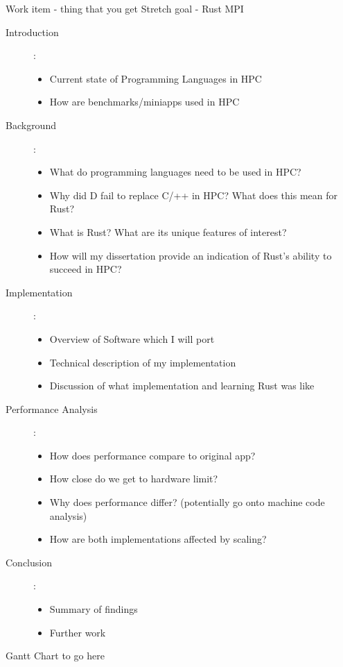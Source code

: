\documentclass{report}
\begin{document}
Work item - thing that you get
Stretch goal - Rust MPI
\begin{description}
  \item[Introduction]:
  \begin{itemize}
    \item Current state of Programming Languages in HPC
    \item How are benchmarks/miniapps used in HPC
  \end{itemize}
  \item[Background]:
    \begin{itemize}
    \item What do programming languages need to be used in HPC?
    \item Why did D fail to replace C/++ in HPC? What does this mean for Rust?
    \item What is Rust? What are its unique features of interest?
    \item How will my dissertation provide an indication of Rust's ability to succeed in HPC?
  \end{itemize}
  \item[Implementation]:
  \begin{itemize}
    \item Overview of Software which I will port
    \item Technical description of my implementation
    \item Discussion of what implementation and learning Rust was like
  \end{itemize}
  \item[Performance Analysis]:
  \begin{itemize}
    \item How does performance compare to original app?
    \item How close do we get to hardware limit?
    \item Why does performance differ? (potentially go onto machine code analysis)
    \item How are both implementations affected by scaling?
  \end{itemize}
  \item[Conclusion] :
  \begin{itemize}
    \item Summary of findings
    \item Further work
  \end{itemize}
\end{description}

Gantt Chart to go here
\end{document}
